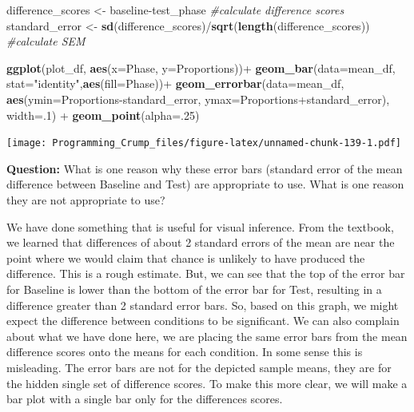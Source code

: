 \documentclass[]{book}
\newenvironment{Shaded}{\begin{snugshade}}{\end{snugshade}}
\newcommand{\KeywordTok}[1]{\textcolor[rgb]{0.13,0.29,0.53}{\textbf{{#1}}}}
\newcommand{\DataTypeTok}[1]{\textcolor[rgb]{0.13,0.29,0.53}{{#1}}}
\newcommand{\DecValTok}[1]{\textcolor[rgb]{0.00,0.00,0.81}{{#1}}}
\newcommand{\StringTok}[1]{\textcolor[rgb]{0.31,0.60,0.02}{{#1}}}
\newcommand{\CommentTok}[1]{\textcolor[rgb]{0.56,0.35,0.01}{\textit{{#1}}}}
\newcommand{\NormalTok}[1]{{#1}}
\theoremstyle{definition}
\theoremstyle{definition}
\theoremstyle{definition}
\theoremstyle{remark}
\begin{document}
\begin{Shaded}
\begin{Highlighting}[]
\NormalTok{difference_scores <-}\StringTok{ }\NormalTok{baseline-test_phase }\CommentTok{#calculate difference scores}
\NormalTok{standard_error <-}\StringTok{ }\KeywordTok{sd}\NormalTok{(difference_scores)/}\KeywordTok{sqrt}\NormalTok{(}\KeywordTok{length}\NormalTok{(difference_scores)) }\CommentTok{#calculate SEM}


\KeywordTok{ggplot}\NormalTok{(plot_df, }\KeywordTok{aes}\NormalTok{(}\DataTypeTok{x=}\NormalTok{Phase, }\DataTypeTok{y=}\NormalTok{Proportions))+}\StringTok{ }
\StringTok{  }\KeywordTok{geom_bar}\NormalTok{(}\DataTypeTok{data=}\NormalTok{mean_df, }\DataTypeTok{stat=}\StringTok{"identity"}\NormalTok{,}\KeywordTok{aes}\NormalTok{(}\DataTypeTok{fill=}\NormalTok{Phase))+}
\StringTok{  }\KeywordTok{geom_errorbar}\NormalTok{(}\DataTypeTok{data=}\NormalTok{mean_df, }\KeywordTok{aes}\NormalTok{(}\DataTypeTok{ymin=}\NormalTok{Proportions-standard_error, }
                                  \DataTypeTok{ymax=}\NormalTok{Proportions+standard_error), }\DataTypeTok{width=}\NormalTok{.}\DecValTok{1}\NormalTok{) +}
\StringTok{  }\KeywordTok{geom_point}\NormalTok{(}\DataTypeTok{alpha=}\NormalTok{.}\DecValTok{25}\NormalTok{)}
\end{Highlighting}
\end{Shaded}

\texttt{[image: Programming\_Crump\_files/figure-latex/unnamed-chunk-139-1.pdf]}

\textbf{Question:} What is one reason why these error bars (standard
error of the mean difference between Baseline and Test) are appropriate
to use. What is one reason they are not appropriate to use?

We have done something that is useful for visual inference. From the
textbook, we learned that differences of about 2 standard errors of the
mean are near the point where we would claim that chance is unlikely to
have produced the difference. This is a rough estimate. But, we can see
that the top of the error bar for Baseline is lower than the bottom of
the error bar for Test, resulting in a difference greater than 2
standard error bars. So, based on this graph, we might expect the
difference between conditions to be significant. We can also complain
about what we have done here, we are placing the same error bars from
the mean difference scores onto the means for each condition. In some
sense this is misleading. The error bars are not for the depicted sample
means, they are for the hidden single set of difference scores. To make
this more clear, we will make a bar plot with a single bar only for the
differences scores.
\end{document}
